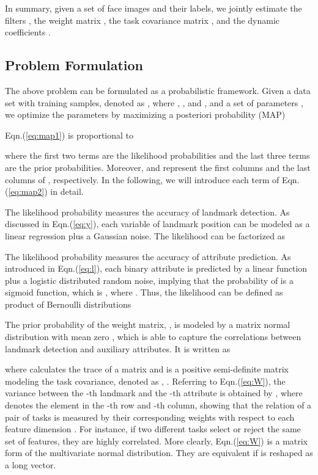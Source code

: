\documentclass[10pt,journal,compsoc]{IEEEtran}
\begin{document}
In summary, given a set of face images and their labels, we jointly estimate the filters , the weight matrix , the task covariance matrix , and the dynamic coefficients .

\subsection{Problem Formulation}
\label{sec:problemformulation}

The above problem can be formulated as a probabilistic framework.
Given a data set with  training samples, denoted as , where , , and , and a set of parameters , we optimize the parameters by maximizing a posteriori probability (MAP)

Eqn.(\ref{eq:map1}) is proportional to

where the first two terms are the likelihood probabilities and the last three terms are the prior probabilities. Moreover,  and  represent the first  columns and the last  columns of , respectively. In the following, we will introduce each term of Eqn.(\ref{eq:map2}) in detail.

 The likelihood probability  measures the accuracy of landmark detection. As discussed in Eqn.(\ref{eq:y}), each variable of landmark position can be modeled as a linear regression plus a Gaussian noise.
The likelihood can be factorized as



 The likelihood probability  measures the accuracy of attribute prediction. As introduced in Eqn.(\ref{eq:l}), each binary attribute is predicted by a linear function plus a logistic distributed random noise, implying that the probability of  is a sigmoid function, which is , where .
Thus, the likelihood can be defined as product of Bernoulli distributions


 The prior probability of the weight matrix, , is modeled by a matrix normal distribution with mean zero \cite{gupta1999matrix}, which is able to capture the correlations between landmark detection and auxiliary attributes.
It is written as

where  calculates the trace of a matrix and  is a positive semi-definite matrix modeling the task covariance, denoted as , .
Referring to Eqn.(\ref{eq:W}), the variance between the -th landmark and the -th attribute is obtained by , where  denotes the element in the -th row and -th column, showing that the relation of a pair of tasks is measured by their corresponding weights with respect to each feature dimension .
For instance, if two different tasks select or reject the same set of features, they are highly correlated.
More clearly, Eqn.(\ref{eq:W}) is a matrix form of the multivariate normal distribution. They are equivalent if  is reshaped as a long vector.
\end{document}
